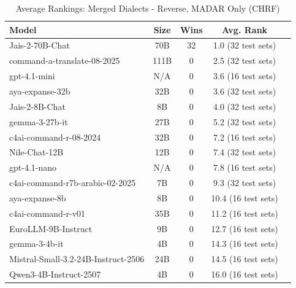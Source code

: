 \begin{table}[htbp]
\centering
\caption{Average Rankings: Merged Dialects - Reverse, MADAR Only (CHRF)}
\label{tab:avg_rankings_chrf}
\begin{tabular}{l@{\hspace{3pt}}c@{\hspace{3pt}}c@{\hspace{3pt}}c@{\hspace{3pt}}c}
\toprule
Model & Size & Wins & Avg. Rank \\
\midrule
Jais-2-70B-Chat & 70B & 32 & 1.0 (32 test sets) \\
command-a-translate-08-2025 & 111B & 0 & 2.5 (32 test sets) \\
gpt-4.1-mini & N/A & 0 & 3.6 (16 test sets) \\
aya-expanse-32b & 32B & 0 & 3.6 (32 test sets) \\
Jais-2-8B-Chat & 8B & 0 & 4.0 (32 test sets) \\
gemma-3-27b-it & 27B & 0 & 5.2 (32 test sets) \\
c4ai-command-r-08-2024 & 32B & 0 & 7.2 (16 test sets) \\
Nile-Chat-12B & 12B & 0 & 7.4 (32 test sets) \\
gpt-4.1-nano & N/A & 0 & 7.8 (16 test sets) \\
c4ai-command-r7b-arabic-02-2025 & 7B & 0 & 9.3 (32 test sets) \\
aya-expanse-8b & 8B & 0 & 10.4 (16 test sets) \\
c4ai-command-r-v01 & 35B & 0 & 11.2 (16 test sets) \\
EuroLLM-9B-Instruct & 9B & 0 & 12.7 (16 test sets) \\
gemma-3-4b-it & 4B & 0 & 14.3 (16 test sets) \\
Mistral-Small-3.2-24B-Instruct-2506 & 24B & 0 & 14.5 (16 test sets) \\
Qwen3-4B-Instruct-2507 & 4B & 0 & 16.0 (16 test sets) \\
\bottomrule
\end{tabular}
\end{table}